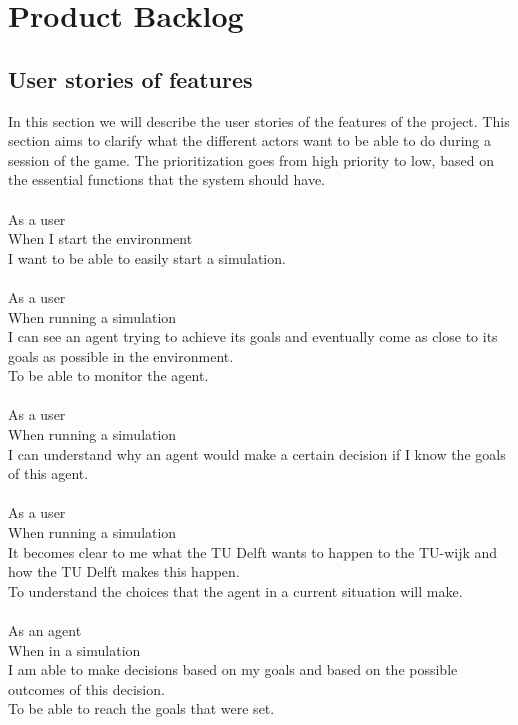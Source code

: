 \section{Product Backlog}

\subsection{User stories of features}

In this section we will describe the user stories of the features of the project. This section aims to clarify what the different actors want to be able to do during a session of the game. The prioritization goes from high priority to low, based on the essential functions that the system should have.\\
\\
As a user\\
When I start the environment\\
I want to be able to easily start a simulation.\\
\\
As a user\\
When running a simulation\\
I can see an agent trying to achieve its goals and eventually come as close to its goals as possible in the environment.\\
To be able to monitor the agent.\\
\\
As a user\\
When running a simulation\\
I can understand why an agent would make a certain decision if I know the goals of this agent.\\
\\
As a user\\
When running a simulation\\
It becomes clear to me what the TU Delft wants to happen to the TU-wijk and how the TU Delft makes this happen.\\
To understand the choices that the agent in a current situation will make.\\
\\
As an agent\\
When in a simulation\\
I am able to make decisions based on my goals and based on the possible outcomes of this decision.\\
To be able to reach the goals that were set.\\
\\
